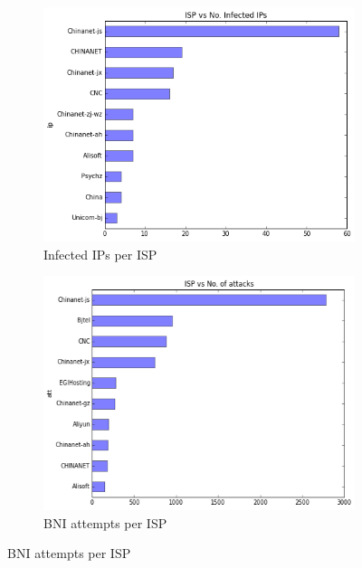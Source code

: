 \begin{figure}[ht]
    \begin{subfigure}[ht]{0.5\linewidth}
        \caption{Infected IPs per ISP}
    \centering
    \includegraphics[width=\linewidth]{images/isp_no_ip}
    \end{subfigure}
\quad
    \begin{subfigure}[ht]{0.5\textwidth}
    \caption{BNI attempts per ISP}
    \centering
    \includegraphics[width=\linewidth]{images/isp_no_att}
    \end{subfigure}

\end{figure}
